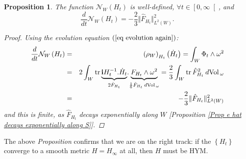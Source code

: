 \documentclass{article}
\newcommand{\func}[1]{\textnormal {#1\,}}
\newcommand{\dvol}{\:d\func{Vol}_\omega}
\newtheorem{proposition}[theorem]{Proposition}
\begin{document}
\begin{proposition}
\label{Prop Nw is defined and bounded above}
The function $\mathcal{N}_{W}\left( H_{t}\right) $ 
is well-defined, $\forall t\in \left[ 0,\infty\right[ $, and
\begin{equation*}
        \frac{d}{dt}\mathcal{N}_{W}\left( H_{t}\right) 
        =-\frac{2}{3}\Vert \hat{F}_{H_{t}}\Vert _
        {L^{2}\left( W\right) }^{2}.
\end{equation*}
\begin{proof}
Using the evolution equation $\left( \ref{eq evolution again}\right)$:
\begin{eqnarray*}
        \frac{d}{dt}\mathcal{N}_{W}\left( H_{t}\right) 
        &=& \left( \rho _{W}\right)_{H_{t}}\left( \dot{H}_{t}\right) 
        = \int_{W}\Phi _{t}\wedge \omega ^{2} \\
        &=& 2\int_{W}\func{tr}\underset{2\hat{F}_{H_{t}}}{\underbrace{\mathbf{i}%
        H_{t}^{-1}.\dot{H}_{t}}}.\underset{\frac{1}{6}\hat{F}_{H_{t}}\dvol}{\underbrace{F_{H_{t}}
        \wedge \omega ^{2}}} 
        = \frac{2}{3}\int_{W}\func{tr}\hat{F}_{H_{t}}^{2}\dvol \\
        &=& -\frac{2}{3}\Vert \hat{F}_{H_{t}}\Vert
        _{L^{2}\left( W\right)}^{2}
\end{eqnarray*}%
and this is finite, as $\hat{F}_{H_{t}}$ decays exponentially along $W$ [\emph{Proposition \ref{Prop e hat decays
exponentially along S}}].
\end{proof}
\end{proposition}

The above \emph{Proposition} confirms that we are on the right track: if the $\left\{ H_{t}\right\} $ converge to a smooth metric $H=H_{\infty }$ at all, then $H$ must be HYM.
\end{document}
